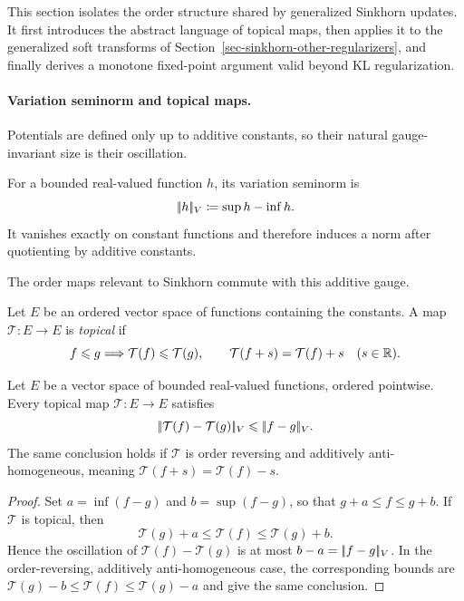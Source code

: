 This section isolates the order structure shared by generalized Sinkhorn updates. It first introduces the abstract language of topical maps, then applies it to the generalized soft transforms of Section~\ref{sec-sinkhorn-other-regularizers}, and finally derives a monotone fixed-point argument valid beyond KL regularization.

\paragraph{Variation seminorm and topical maps.}
Potentials are defined only up to additive constants, so their natural gauge-invariant size is their oscillation.

\begin{defn}\label{def-variation-seminorm}
	For a bounded real-valued function $h$, its variation seminorm is
	\[
		|\!| h |\!|_V\coloneqq \sup h-\inf h.
	\]
	It vanishes exactly on constant functions and therefore induces a norm after quotienting by additive constants.
\end{defn}

The order maps relevant to Sinkhorn commute with this additive gauge.
\begin{defn}\label{def-topical-map}
	Let $E$ be an ordered vector space of functions containing the constants. A map $\mathcal T:E\to E$ is \emph{topical} if
	\[
		f\leqslant g\Longrightarrow\mathcal T(f)\leqslant\mathcal T(g),
		\qquad
		\mathcal T(f+s)=\mathcal T(f)+s
		\quad(s\in\mathbb{R}).
	\]
\end{defn}

\begin{prop}\label{prop-topical-variation-nonexpansive}
	Let $E$ be a vector space of bounded real-valued functions, ordered pointwise. Every topical map $\mathcal T:E\to E$ satisfies
	\[
		|\!| \mathcal T(f)-\mathcal T(g) |\!|_V
		\leqslant
		|\!| f-g |\!|_V.
	\]
	The same conclusion holds if $\mathcal T$ is order reversing and additively anti-homogeneous, meaning $\mathcal T(f+s)=\mathcal T(f)-s$.
\end{prop}

\begin{proof}
	Set $a=\inf(f-g)$ and $b=\sup(f-g)$, so that $g+a\leq f\leq g+b$. If $\mathcal T$ is topical, then
	\[
		\mathcal T(g)+a\leq\mathcal T(f)\leq\mathcal T(g)+b.
	\]
	Hence the oscillation of $\mathcal T(f)-\mathcal T(g)$ is at most $b-a=|\!| f-g |\!|_V$. In the order-reversing, additively anti-homogeneous case, the corresponding bounds are $\mathcal T(g)-b\leq\mathcal T(f)\leq\mathcal T(g)-a$ and give the same conclusion.
\end{proof}


